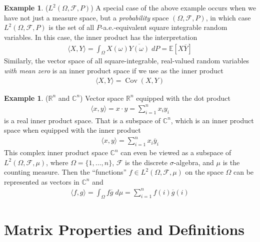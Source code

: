 \documentclass[12pt]{book}
\numberwithin{equation}{section} %
\theoremstyle{plain}
\theoremstyle{definition}
\newtheorem{ex}[thm]{Example}
\theoremstyle{remark}
\newcommand{\sF}{\mathscr{F}}
\newcommand{\R}{\mathbb{R}}
\newcommand{\C}{\mathbb{C}}
\newcommand{\E}{\mathbb{E}}
\newcommand{\Cov}{\operatorname{Cov}}
\newcommand{\sumin}{\sum^n_{i=1}}
\begin{document}
\begin{ex}($L^2(\Omega,\sF,P)$)
A special case of the above example occurs when we have not just a
measure space, but a \emph{probability} space $(\Omega,\sF,P)$, in which
case $L^2(\Omega,\sF,P)$ is the set of all $P$-a.e.-equivalent square
integrable random variables.
In this case, the inner product has the interpretation
\begin{align*}
  \langle X,Y \rangle
  = \int_\Omega X(\omega)\overline{Y(\omega)} \; dP
  = \E[X\overline{Y}]
\end{align*}
Similarly, the vector space of all square-integrable, real-valued random
variables \emph{with mean zero} is an inner product space if we use as
the inner product
\begin{align*}
  \langle X, Y\rangle
  =
  \Cov(X,Y)
\end{align*}
\end{ex}

\begin{ex}($\R^n$ and $\C^n$)
Vector space $\R^n$ equipped with the dot product
\begin{align*}
  \langle x,y\rangle = x\cdot y = \sumin x_iy_i
\end{align*}
is a real inner product space.
That is a subspace of $\C^n$, which is an inner product space when
equipped with the inner product
\begin{align*}
  \langle x,y\rangle = \sumin x_i\bar{y}_i
\end{align*}
This complex inner product space $\C^n$ can even be viewed as a subspace
of $L^2(\Omega,\sF,\mu)$, where $\Omega=\{1,\ldots,n\}$, $\sF$ is the
discrete $\sigma$-algebra, and $\mu$ is the counting measure.
Then the ``functions'' $f\in L^2(\Omega,\sF,\mu)$ on the space $\Omega$
can be represented as vectors in $\C^n$ and 
\begin{align*}
  \langle
  f,g
  \rangle
  =
  \int_{\Omega}
  f\overline{g}\;d\mu
  =
  \sum_{i=1}^n
  f(i)\overline{g}(i)
\end{align*}

\end{ex}





\clearpage
\section{Matrix Properties and Definitions}
\end{document}
